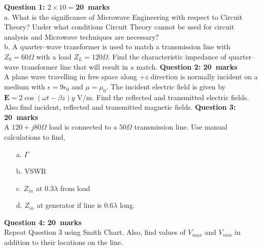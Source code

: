 \documentclass[12pt,a4paper]{article}
\def\Qone{20}
\def\Qtwo{20}
\def\Qthree{20}
\def\Qfour{20}
\begin{document}
\newpage
\pagestyle{fancy}
\noindent\textbf{Question 1: \hfill $2\times10=$\Qone~marks}\\
a. What is the significance of Microwave Engineering with respect to Circuit Theory? Under what conditions Circuit Theory cannot be used for circuit analysis and Microwave techniques are necessary?\\[12.5cm]
b. A quarter--wave transformer is used to match a transmission line with $Z_0=60 \Omega$ with a load $Z_L=120 \Omega$. Find the characteristic impedance of quarter--wave transformer line that will result in a match.
\newpage
\noindent \textbf{Question 2: \hfill \Qtwo~marks}\\
A plane wave travelling in free space along $+z$ direction is normally incident on a medium with $\epsilon=9\epsilon_0$ and $\mu=\mu_0$. The incident electric field is given by $\mathrm{\textbf{E}}=2\cos(\omega t-\beta z)\hat y$ V/m. Find the reflected and transmitted electric fields. Also find incident, reflected and transmitted magnetic fields.
\newpage
\noindent\textbf{Question 3: \hfill \Qthree~marks}\\
A $120+j80\Omega$ load is connected to a $50\Omega$ transmission line. Use manual calculations to find,
\begin{itemize}
\item[a.] $\Gamma$
\item[b.] VSWR
\item[c.] $Z_{in}$ at $0.3\lambda$ from load
\item[d.] $Z_{in}$ at generator if line is $0.6\lambda$ long.
\end{itemize}
\newpage
\noindent\textbf{Question 4: \hfill \Qfour~marks}\\
Repeat Question 3 using Smith Chart. Also, find values of $V_{max}$ and $V_{min}$ in addition to their locations on the line.
\newpage
\end{document}
